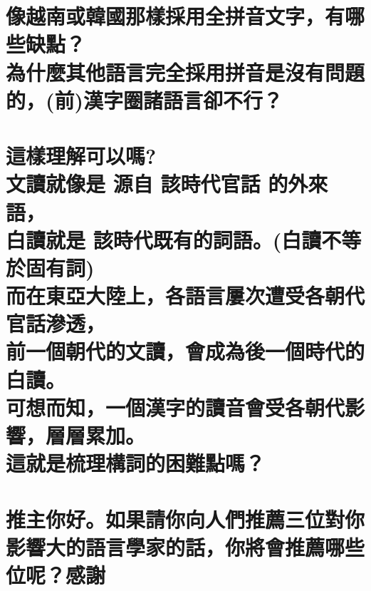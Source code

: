 \chapter[像越南或韓國那樣採用全拼音文字，有哪些缺點？ 為什麼其他語言完全採用拼音是沒有問題的，(前)漢字圈諸語言卻不行？]{像越南或韓國那樣採用全拼音文字，有哪些缺點？ \\[0.35em] 為什麼其他語言完全採用拼音是沒有問題的，(前)漢字圈諸語言卻不行？}

\chapter[這樣理解可以嗎? 文讀就像是 源自 該時代官話 的外來語， 白讀就是 該時代既有的詞語。(白讀不等於固有詞) 而在東亞大陸上，各語言屢次遭受各朝代官話滲透， 前一個朝代的文讀，會成為後一個時代的白讀。 可想而知，一個漢字的讀音會受各朝代影響，層層累加。 這就是梳理構詞的困難點嗎？]{這樣理解可以嗎? \\[0.35em] 文讀就像是 源自 該時代官話 的外來語， \\[0.35em] 白讀就是 該時代既有的詞語。(白讀不等於固有詞) \\[0.35em] 而在東亞大陸上，各語言屢次遭受各朝代官話滲透， \\[0.35em] 前一個朝代的文讀，會成為後一個時代的白讀。 \\[0.35em] 可想而知，一個漢字的讀音會受各朝代影響，層層累加。 \\[0.35em] 這就是梳理構詞的困難點嗎？}

\chapter[推主你好。如果請你向人們推薦三位對你影響大的語言學家的話，你將會推薦哪些位呢？感謝]{推主你好。如果請你向人們推薦三位對你影響大的語言學家的話，你將會推薦哪些位呢？感謝}

